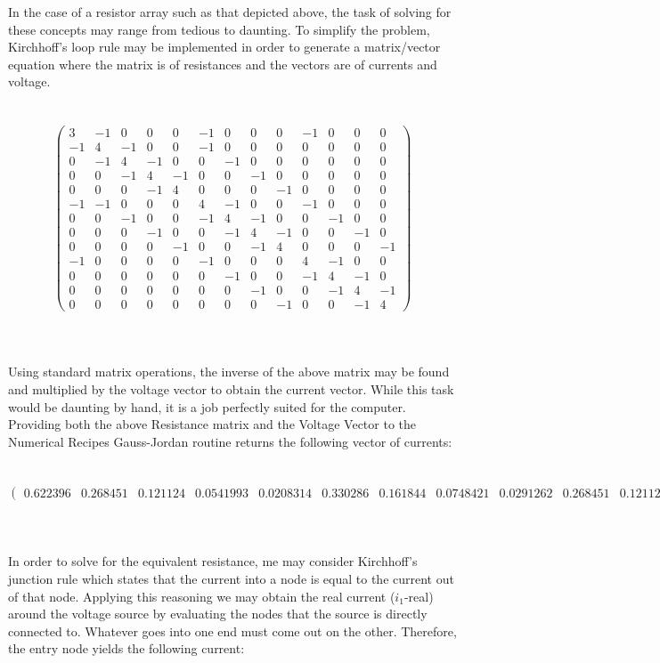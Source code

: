 \documentclass{report}
\begin{document}
\begin{enumerate}
In the case of a resistor array such as that depicted above, the task of solving for these concepts may range from tedious to daunting. To simplify the problem, Kirchhoff's loop rule may be implemented in order to generate a matrix/vector equation where the matrix is of resistances and the vectors are of currents and voltage. 
\\
\\
\\
\[ \left( \begin{array}{ccccccccccccc}
3&-1&0&0&0&-1&0&0&0&-1&0&0&0 \\
-1&4&-1&0&0&-1&0&0&0&0&0&0&0 \\
0&-1&4&-1&0&0&-1&0&0&0&0&0&0 \\
0&0&-1&4&-1&0&0&-1&0&0&0&0&0 \\
0&0&0&-1&4&0&0&0&-1&0&0&0&0 \\
-1&-1&0&0&0&4&-1&0&0&-1&0&0&0 \\
0&0&-1&0&0&-1&4&-1&0&0&-1&0&0 \\
0&0&0&-1&0&0&-1&4&-1&0&0&-1&0 \\
0&0&0&0&-1&0&0&-1&4&0&0&0&-1 \\
-1&0&0&0&0&-1&0&0&0&4&-1&0&0 \\
0&0&0&0&0&0&-1&0&0&-1&4&-1&0 \\
0&0&0&0&0&0&0&-1&0&0&-1&4&-1 \\
0&0&0&0&0&0&0&0&-1&0&0&-1&4 \end{array} \right)\] 
\\
\\
\\
Using standard matrix operations, the inverse of the above matrix may be found and multiplied by the voltage vector to obtain the current vector. While this task would be daunting by hand, it is a job perfectly suited for the computer. Providing both the above Resistance matrix and the Voltage Vector to the Numerical Recipes Gauss-Jordan routine returns the following vector of currents:
\\
\\
\\
\[ \left( \begin{array}{c}
0.622396 &
0.268451 &
0.121124 &
0.0541993 &
0.0208314 &
0.330286 &
0.161844 &
0.0748421 &
0.0291262 &
0.268451 &
0.121124 &
0.0541993 &
0.0208314 \end{array} \right)\] 
\\   
\\
\\
In order to solve for the equivalent resistance, me may consider Kirchhoff's junction rule which states that the current into a node is equal to the current out of that node. Applying this reasoning we may obtain the real current ($i_1$-real) around the voltage source by evaluating the nodes that the source is directly connected to. Whatever goes into one end must come out on the other. Therefore, the entry node yields the following current:

\end{enumerate}
\end{document}
